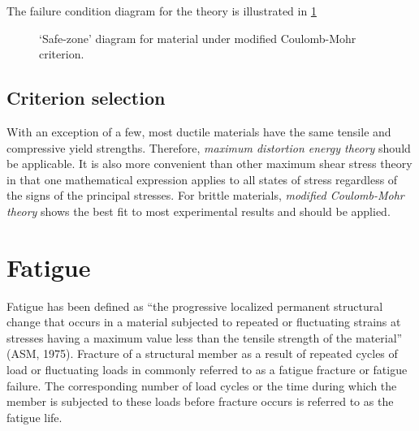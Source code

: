 \documentclass[
10pt,
a4paper,
openany,
svgnames,
]{book}
\begin{document}
The failure condition diagram for the theory is illustrated in \cref{fig: MCM safe zone}

\begin{figure}[h]
  \centering
  \caption{`Safe-zone' diagram for material under modified Coulomb-Mohr criterion.}
  \label{fig: MCM safe zone}
\end{figure}

\subsection{Criterion selection}

With an exception of a few, most ductile materials have the same tensile and compressive yield strengths. Therefore, \emph{maximum distortion energy theory} should be applicable. It is also more convenient than other maximum shear stress theory in that one mathematical expression applies to all states of stress regardless of the signs of the principal stresses.
For brittle materials, \emph{modified Coulomb-Mohr theory} shows the best fit to most experimental results and should be applied.

\section{Fatigue}

Fatigue has been defined as “the progressive localized permanent structural change that occurs in a material subjected to repeated or fluctuating strains at stresses having a maximum value less than the tensile strength of the material” (ASM, 1975). Fracture of a structural member as a result of repeated cycles of load or fluctuating loads in commonly referred to as a fatigue fracture or fatigue failure. The corresponding number of load cycles or the time during which the member is subjected to these loads before fracture occurs is referred to as the fatigue life.
\end{document}
